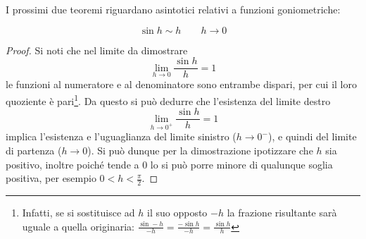 I prossimi due teoremi riguardano asintotici relativi a funzioni goniometriche:
\begin{teor}
	\label{deriv:sin}
	\[
		\sin h\sim h\qquad h\to0
	\]
\end{teor}
\begin{proof}
	Si noti che nel limite da dimostrare
	\[
		\lim_{h\to0} \frac{\sin h}{h}=1
	\]
	le funzioni al numeratore e al denominatore sono entrambe dispari, per cui il loro quoziente è pari\footnote{Infatti, se si sostituisce ad $h$ il suo opposto $-h$ la frazione risultante sarà uguale a quella originaria: $\frac{\sin -h}{-h}=\frac{-\sin h}{-h}=\frac{\sin h}{h}$}. Da questo si può dedurre che l'esistenza del limite destro
	\[
		\lim_{h\to0^+} \frac{\sin h}{h}=1
	\]
	implica l'esistenza e l'uguaglianza del limite sinistro ($h\to0^-$), e quindi del limite di partenza ($h\to0$). Si può dunque per la dimostrazione ipotizzare che $h$ sia positivo, inoltre poiché tende a $0$ lo si può porre minore di qualunque soglia positiva, per esempio $0<h<\frac{\pi}{2}$.


\end{proof}

